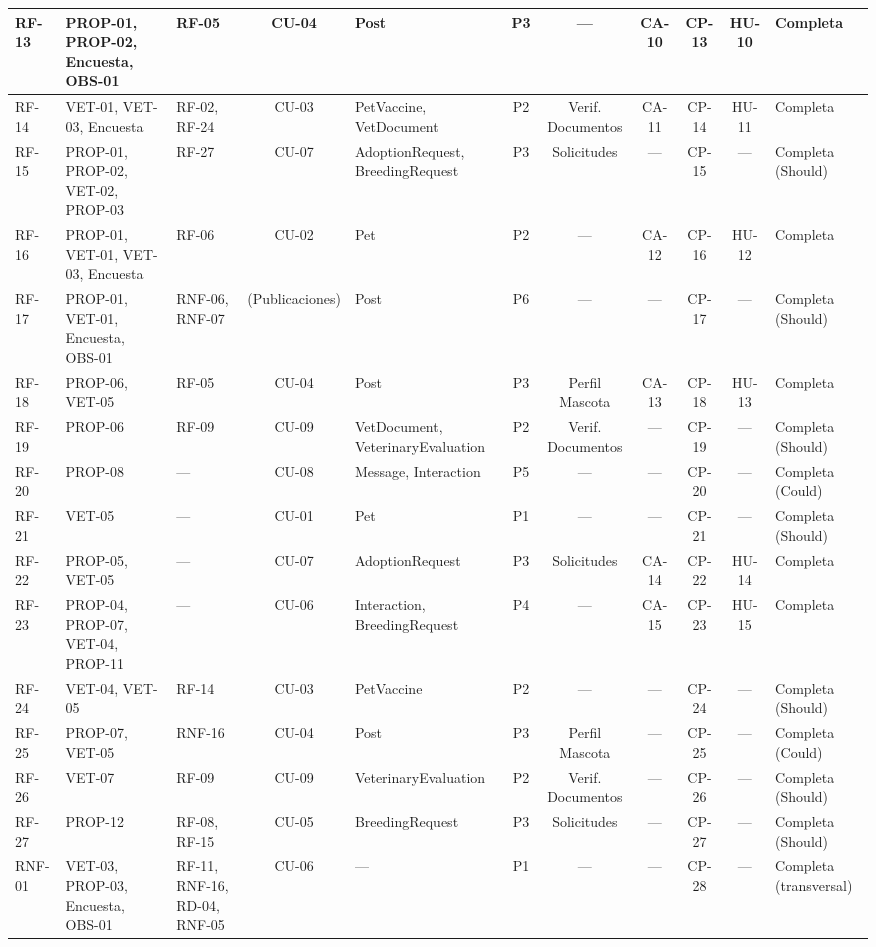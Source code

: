 \documentclass[journal,onecolumn]{IEEEtran}
\begin{document}
\begin{landscape}
\begin{table}[H]
\begin{tabularx}{\linewidth}{|l|X|X|c|X|c|c|c|c|c|X|}
		RF-13 & PROP-01, PROP-02, Encuesta, OBS-01 & RF-05 & CU-04 & Post & P3 & --- & CA-10 & CP-13 & HU-10 & Completa \\ \hline
		RF-14 & VET-01, VET-03, Encuesta & RF-02, RF-24 & CU-03 & PetVaccine, VetDocument & P2 & Verif. Documentos & CA-11 & CP-14 & HU-11 & Completa \\ \hline
		RF-15 & PROP-01, PROP-02, VET-02, PROP-03 & RF-27 & CU-07 & AdoptionRequest, BreedingRequest & P3 & Solicitudes & --- & CP-15 & --- & Completa (Should) \\ \hline
		RF-16 & PROP-01, VET-01, VET-03, Encuesta & RF-06 & CU-02 & Pet & P2 & --- & CA-12 & CP-16 & HU-12 & Completa \\ \hline
		RF-17 & PROP-01, VET-01, Encuesta, OBS-01 & RNF-06, RNF-07 & (Publicaciones) & Post & P6 & --- & --- & CP-17 & --- & Completa (Should) \\ \hline
		RF-18 & PROP-06, VET-05 & RF-05 & CU-04 & Post & P3 & Perfil Mascota & CA-13 & CP-18 & HU-13 & Completa \\ \hline
		RF-19 & PROP-06 & RF-09 & CU-09 & VetDocument, VeterinaryEvaluation & P2 & Verif. Documentos & --- & CP-19 & --- & Completa (Should) \\ \hline
		RF-20 & PROP-08 & --- & CU-08 & Message, Interaction & P5 & --- & --- & CP-20 & --- & Completa (Could) \\ \hline
		RF-21 & VET-05 & --- & CU-01 & Pet & P1 & --- & --- & CP-21 & --- & Completa (Should) \\ \hline
		RF-22 & PROP-05, VET-05 & --- & CU-07 & AdoptionRequest & P3 & Solicitudes & CA-14 & CP-22 & HU-14 & Completa \\ \hline
		RF-23 & PROP-04, PROP-07, VET-04, PROP-11 & --- & CU-06 & Interaction, BreedingRequest & P4 & --- & CA-15 & CP-23 & HU-15 & Completa \\ \hline
		RF-24 & VET-04, VET-05 & RF-14 & CU-03 & PetVaccine & P2 & --- & --- & CP-24 & --- & Completa (Should) \\ \hline
		RF-25 & PROP-07, VET-05 & RNF-16 & CU-04 & Post & P3 & Perfil Mascota & --- & CP-25 & --- & Completa (Could) \\ \hline
		RF-26 & VET-07 & RF-09 & CU-09 & VeterinaryEvaluation & P2 & Verif. Documentos & --- & CP-26 & --- & Completa (Should) \\ \hline
		RF-27 & PROP-12 & RF-08, RF-15 & CU-05 & BreedingRequest & P3 & Solicitudes & --- & CP-27 & --- & Completa (Should) \\ \hline
		RNF-01 & VET-03, PROP-03, Encuesta, OBS-01 & RF-11, RNF-16, RD-04, RNF-05 & CU-06 & --- & P1 & --- & --- & CP-28 & --- & Completa (transversal) \\ \hline

\end{tabularx}
\end{table}
\end{landscape}
\end{document}
